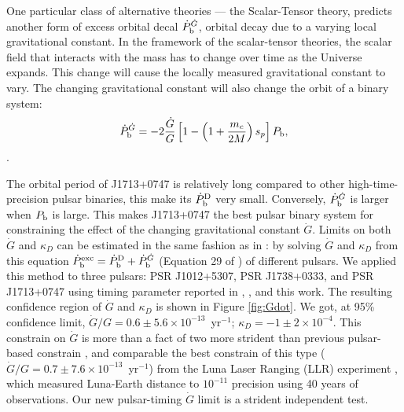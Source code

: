 One particular class of alternative theories --- the Scalar-Tensor theory,
predicts another form of excess orbital decal $\dot{P}_{\rm b}^{\dot{G}}$,
orbital decay due to a varying
local gravitational constant. In the framework of the scalar-tensor theories,
the scalar field that interacts with the mass has to change over time as the
Universe expands. This change will cause the locally measured gravitational
constant to vary. The changing gravitational constant will also change
the orbit of a binary system:
\begin{equation}
\dot{P}_{\rm b}^{\dot{G}} = -2 \frac{\dot{G}}{G}
\left[1-\left(1+\frac{m_c}{2M}\right)s_p\right]P_{\rm b},
\end{equation} \citep{dgt88,nor90}.

The orbital period of J1713+0747 is relatively long compared to other
high-time-precision pulsar binaries, this make its $\dot{P}_{\rm b}^{\rm D}$
very small. Conversely, $\dot{P}_{\rm b}^{\dot{G}}$ is larger when $P_{\rm b}$
is large. This makes J1713+0747 the best pulsar binary system for constraining
the effect of the changing gravitational constant $\dot{G}$. Limits 
on both $\dot{G}$ and $\kappa_D$ can be estimated in the same fashion as in
\citet{lwj+09}: by solving $\dot{G}$ and $\kappa_D$
from this equation $\dot{P}_{\rm b}^{\rm exc} = \dot{P}_{\rm b}^{\rm D} +
\dot{P}_{\rm b}^{\dot{G}}$ (Equation 29 of \citealt{lwj+09}) of different
pulsars. We applied this method to three pulsars: PSR J1012+5307, PSR
J1738+0333, and PSR J1713+0747 using timing parameter reported in
\citet{lwj+09}, \citet{fwe+12}, and this work.
The resulting confidence region of $\dot{G}$ and $\kappa_D$ is shown in Figure
\ref{fig:Gdot}.
We got, at 95\% confidence limit, $\dot{G}/G =
0.6\pm5.6\times10^{-13}$~yr$^{-1}$; $\kappa_D=-1\pm2\times10^{-4}$. 
This constrain on $\dot{G}$ is more than a fact of two more strident than
previous pulsar-based constrain \citep{fwe+12}, and comparable
the best constrain of this type
($\dot{G}/G=0.7\pm7.6\times10^{-13}$~yr$^{-1}$) from the Luna Laser Ranging
(LLR)
experiment \citep{hmb10}, which measured Luna-Earth distance to $10^{-11}$
precision using 40 years of observations.
Our new pulsar-timing  $\dot{G}$ limit is a strident independent test.  

